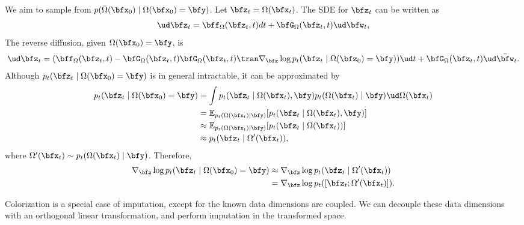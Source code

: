 We aim to sample from $p(\bar{\Omega}(\bfx_0) \mid \Omega(\bfx_0) = \bfy)$. Let $\bfz_t = \Omega(\bfx_t)$. The SDE for $\bfz_t$ can be written as
\begin{align*}
\ud \bfz_t = \bff_\Omega(\bfz_t, t) dt + \bfG_\Omega(\bfz_t, t) \ud \bfw_t,
\end{align*}
The reverse diffusion, given $\Omega(\bfx_0) = \bfy$, is
\begin{align*}
\ud\bfz_t = (\bff_\Omega(\bfz_t, t) - \bfG_\Omega(\bfz_t, t)\bfG_\Omega(\bfz_t, t)\tran \nabla_\bfz \log p_t(\bfz_t \mid \Omega(\bfz_0) = \bfy))\ud t + \bfG_\Omega(\bfz_t, t)\ud\bar{\bfw}_t.
\end{align*}
Although $p_t(\bfz_t \mid \Omega(\bfx_0) = \bfy)$ is in general intractable, it can be approximated by
\begin{align*}
p_t(\bfz_t \mid \Omega(\bfx_0) = \bfy) &= \int p_t(\bfz_t \mid \Omega(\bfx_t), \bfy) p_t(\Omega(\bfx_t) \mid \bfy) \ud \Omega(\bfx_t) \\
&= \mathbb{E}_{p_t(\Omega(\bfx_t) \mid \bfy)}[p_t(\bfz_t \mid \Omega(\bfx_t), \bfy)]\\
&\approx \mathbb{E}_{p_t(\Omega(\bfx_t) \mid \bfy)}[p_t(\bfz_t \mid \Omega(\bfx_t))]\\
&\approx p_t(\bfz_t \mid \Omega'(\bfx_t)),
\end{align*}
where $\Omega'(\bfx_t) \sim p_t(\Omega(\bfx_t) \mid \bfy)$.
Therefore,
\begin{align*}
\nabla_\bfz \log p_t(\bfz_t \mid \Omega(\bfx_0)=\bfy) &\approx \nabla_\bfz \log p_t(\bfz_t \mid \Omega'(\bfx_t)) \\
&= \nabla_\bfz \log p_t([\bfz_t; \Omega'(\bfx_t)]).
\end{align*}

Colorization is a special case of imputation, except for the known data dimensions are coupled. We can decouple these data dimensions with an orthogonal linear transformation, and perform imputation in the transformed space. 